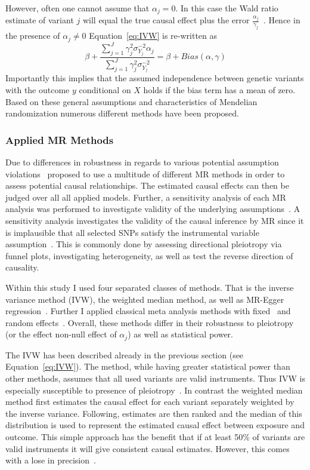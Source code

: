 However, often one cannot assume that $\alpha_j = 0$.
In this case the Wald ratio estimate of variant $j$ will equal the true causal effect plus the error $\frac{\alpha_j}{\gamma_j}$~\cite{Bowden2015}. 
Hence in the presence of $\alpha_j \neq 0$ Equation~\ref{eq:IVW} is re-written as
\begin{equation} \label{eq:TSLSbias}
  \beta + \frac{\sum^J_{j=1} \gamma_j^2\sigma_{Y_j}^{-2} \alpha_j}
  {\sum^J_{j=1} \gamma_j^2\sigma_{Y_j}^{-2}} = \beta + Bias(\alpha, \gamma)
\end{equation}
Importantly this implies that the assumed independence between genetic variants with the outcome $y$ conditional on $X$ holds if the bias term has a mean of zero.
Based on these general assumptions and characteristics of Mendelian randomization numerous different methods have been proposed.

\subsubsection{Applied MR Methods}
\label{ssub:Used_Metheds}

Due to differences in robustness in regards to various potential assumption violations~\citet{Burgess2016} proposed to use a multitude of different MR methods in order to assess potential causal relationships.
The estimated causal effects can then be judged over all all applied models.
Further, a sensitivity analysis of each MR analysis was performed to investigate validity of the underlying assumptions~\cite{Burgess2016}.
A sensitivity analysis investigates the validity of the causal inference by MR since it is implausible that all selected SNPs satisfy the instrumental variable assumption~\cite{Burgess2016}.
This is commonly done by assessing directional pleiotropy via funnel plots, investigating heterogeneity, as well as test the reverse direction of causality.

Within this study I used four separated classes of methods.
That is the inverse variance method (IVW), the weighted median method, as well as MR-Egger regression~\cite{Bowden2015}.
Further I applied classical meta analysis methods with fixed~\cite{Nelson2015a} and random effects~\cite{Ahmad2015a}.
Overall, these methods differ in their robustness to pleiotropy (or the effect non-null effect of $\alpha_j$) as well as statistical power.

The IVW has been described already in the previous section (see Equation~\ref{eq:IVW}).
The method, while having greater statistical power than other methods, assumes that all used variants are valid instruments.
Thus IVW is especially susceptible to presence of pleiotropy~\cite{Burgess2015b}.
In contrast the weighted median method first estimates the causal effect for each variant separately weighted by the inverse variance. 
Following, estimates are then ranked and the median of this distribution is used to represent the estimated causal effect between exposure and outcome.
This simple approach has the benefit that if at least 50\% of variants are valid instruments it will give consistent causal estimates.
However, this comes with a lose in precision~\cite{Bowden2015}.

